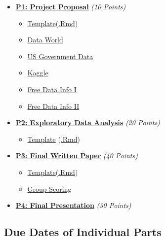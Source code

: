 \documentclass[
]{article}
\providecommand{\tightlist}{%
  \setlength{\itemsep}{0pt}\setlength{\parskip}{0pt}}
\begin{document}
\begin{itemize}
\tightlist
\item
  \textbf{\href{Final\%20Project/Project-Proposal.html}{P1: Project
  Proposal}} \emph{(10 Points)}

  \begin{itemize}
  \tightlist
  \item
    \href{Final\%20Project/Project_Proposal_Template.html}{Template}(\href{Final\%20Project/Project_Proposal_Template.Rmd}{.Rmd})
  \item
    \href{https://data.world/datasets/download}{Data World}
  \item
    \href{https://www.data.gov/}{US Government Data}
  \item
    \href{https://www.kaggle.com/}{Kaggle}
  \item
    \href{https://www.forbes.com/sites/bernardmarr/2016/02/12/big-data-35-brilliant-and-free-data-sources-for-2016/\#63f06f60b54d}{Free
    Data Info I}
  \item
    \href{https://r-dir.com/reference/datasets.html}{Free Data Info II}
  \end{itemize}
\item
  \textbf{\href{Final\%20Project/Exploratory-Data-Analysis.html}{P2:
  Exploratory Data Analysis}} \emph{(20 Points)}

  \begin{itemize}
  \tightlist
  \item
    \href{Final\%20Project/EDA_Template.html}{Template}
    (\href{Final\%20Project/EDA_Template.rmd}{.Rmd})
  \end{itemize}
\item
  \textbf{\href{Final\%20Project/Final-Paper.html}{P3: Final Written
  Paper}} \emph{(40 Points)}

  \begin{itemize}
  \tightlist
  \item
    \href{Final\%20Project/Final_Report_Template.html}{Template}(\href{Final\%20Project/Final_Report_Template.rmd}{.Rmd})
  \item
    \href{https://forms.gle/8ALCe4H1HR8JCTb37}{Group Scoring}
  \end{itemize}
\item
  \textbf{\href{Final\%20Project/Final-Presentation.html}{P4: Final
  Presentation}} \emph{(30 Points)}
\end{itemize}

\hypertarget{due-dates-of-individual-parts}{%
\subsection{Due Dates of Individual
Parts}\label{due-dates-of-individual-parts}}
\end{document}
